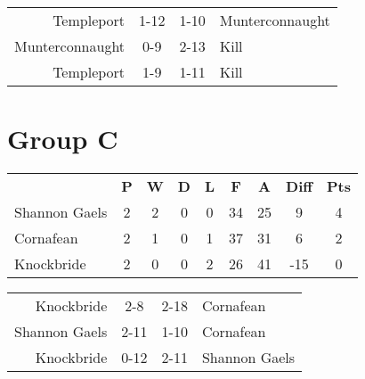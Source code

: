 \documentclass[11pt,a4paper]{article}
\begin{document}
\vspace{10 mm}

\begin{tabular}{rccl}
Templeport & 1-12 & 1-10 & Munterconnaught \\
Munterconnaught & 0-9 & 2-13 & Kill \\
Templeport & 1-9 & 1-11 & Kill \\
\end{tabular}

\section*{Group C}

\begin{tabular}{lcccccccc}
 & \textbf{P} & \textbf{W} & \textbf{D} & \textbf{L} & \textbf{F} & \textbf{A} & \textbf{Diff} & \textbf{Pts} \\
Shannon Gaels & 2 & 2 & 0 & 0 & 34 & 25 & 9 & 4 \\
Cornafean & 2 & 1 & 0 & 1 & 37 & 31 & 6 & 2 \\
Knockbride & 2 & 0 & 0 & 2 & 26 & 41 & -15 & 0 \\
\end{tabular}

\vspace{10 mm}

\begin{tabular}{rccl}
Knockbride & 2-8 & 2-18 & Cornafean \\
Shannon Gaels & 2-11 & 1-10 & Cornafean \\
Knockbride & 0-12 & 2-11 & Shannon Gaels \\
\end{tabular}
\end{document}
